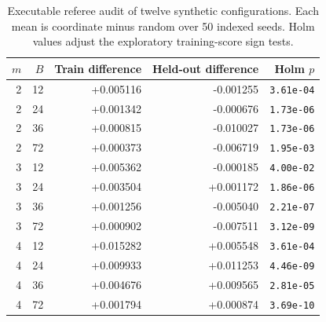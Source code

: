 \begin{table}[htbp]
\centering\footnotesize
\caption{Executable referee audit of twelve synthetic configurations. Each mean is coordinate minus random over 50 indexed seeds. Holm values adjust the exploratory training-score sign tests.}
\label{tab:independent-referee}
\begin{tabular}{rrrrr}
\toprule
$m$ & $B$ & Train difference & Held-out difference & Holm $p$ \\
\midrule
2 & 12 & +0.005116 & -0.001255 & \texttt{3.61e-04}\\
2 & 24 & +0.001342 & -0.000676 & \texttt{1.73e-06}\\
2 & 36 & +0.000815 & -0.010027 & \texttt{1.73e-06}\\
2 & 72 & +0.000373 & -0.006719 & \texttt{1.95e-03}\\
3 & 12 & +0.005362 & -0.000185 & \texttt{4.00e-02}\\
3 & 24 & +0.003504 & +0.001172 & \texttt{1.86e-06}\\
3 & 36 & +0.001256 & -0.005040 & \texttt{2.21e-07}\\
3 & 72 & +0.000902 & -0.007511 & \texttt{3.12e-09}\\
4 & 12 & +0.015282 & +0.005548 & \texttt{3.61e-04}\\
4 & 24 & +0.009933 & +0.011253 & \texttt{4.46e-09}\\
4 & 36 & +0.004676 & +0.009565 & \texttt{2.81e-05}\\
4 & 72 & +0.001794 & +0.000874 & \texttt{3.69e-10}\\
\bottomrule
\end{tabular}
\end{table}
